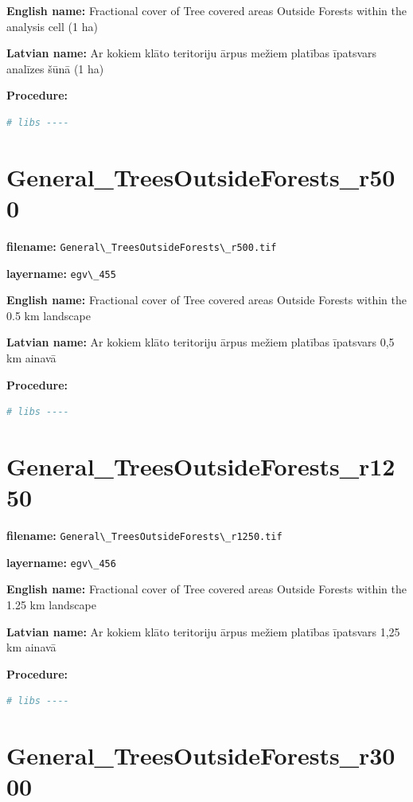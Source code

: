 \documentclass[
]{book}
\newcommand{\passthrough}[1]{#1}
\begin{document}
\textbf{English name:} Fractional cover of Tree covered areas Outside Forests within the analysis cell (1 ha)

\textbf{Latvian name:} Ar kokiem klāto teritoriju ārpus mežiem platības īpatsvars analīzes šūnā (1 ha)

\textbf{Procedure:}

\begin{lstlisting}[language=R]
# libs ----
\end{lstlisting}

\section{General\_TreesOutsideForests\_r500}\label{ch06.455}

\textbf{filename:} \passthrough{\lstinline!General\_TreesOutsideForests\_r500.tif!}

\textbf{layername:} \passthrough{\lstinline!egv\_455!}

\textbf{English name:} Fractional cover of Tree covered areas Outside Forests within the 0.5 km landscape

\textbf{Latvian name:} Ar kokiem klāto teritoriju ārpus mežiem platības īpatsvars 0,5 km ainavā

\textbf{Procedure:}

\begin{lstlisting}[language=R]
# libs ----
\end{lstlisting}

\section{General\_TreesOutsideForests\_r1250}\label{ch06.456}

\textbf{filename:} \passthrough{\lstinline!General\_TreesOutsideForests\_r1250.tif!}

\textbf{layername:} \passthrough{\lstinline!egv\_456!}

\textbf{English name:} Fractional cover of Tree covered areas Outside Forests within the 1.25 km landscape

\textbf{Latvian name:} Ar kokiem klāto teritoriju ārpus mežiem platības īpatsvars 1,25 km ainavā

\textbf{Procedure:}

\begin{lstlisting}[language=R]
# libs ----
\end{lstlisting}

\section{General\_TreesOutsideForests\_r3000}\label{ch06.457}
\end{document}
